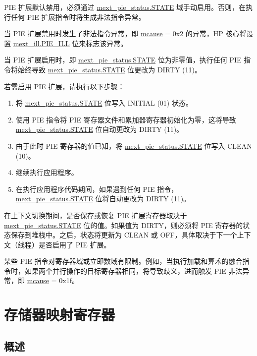 \documentclass[main\_\_CN.tex]{subfiles}
\begin{document}
PIE 扩展默认禁用，必须通过 \hyperref[fielddesc:MEXT_PIE_STATE]{mext\_pie\_status.STATE} 域手动启用。否则，在执行任何 PIE 扩展指令时将生成非法指令异常。

当 PIE 扩展禁用时发生了非法指令异常，即 \hyperref[regdesc:MCAUSE]{mcause} = 0x2 的异常，HP 核心将设置 \hyperref[fielddesc:MEXT_ILL_PIE_ILL]{mext\_ill.PIE\_ILL} 位来标志该异常。

当 PIE 扩展启用时，即 \hyperref[fielddesc:MEXT_PIE_STATE]{mext\_pie\_status.STATE} 位为非零值，执行任何 PIE 指令将始终导致 \hyperref[fielddesc:MEXT_PIE_STATE]{mext\_pie\_status.STATE} 位更改为 DIRTY (11)。

若需启用 PIE 扩展，请执行以下步骤：

\begin{enumerate}
    \item 将 \hyperref[fielddesc:MEXT_PIE_STATE]{mext\_pie\_status.STATE} 位写入 INITIAL (01) 状态。
    \item 使用 PIE 指令将 PIE 寄存器文件和累加器寄存器初始化为零，这将导致 \hyperref[fielddesc:MEXT_PIE_STATE]{mext\_pie\_status.STATE} 位自动更改为 DIRTY (11)。
    \item 由于此时 PIE 寄存器的值已知，将 \hyperref[fielddesc:MEXT_PIE_STATE]{mext\_pie\_status.STATE} 位写入 CLEAN (10)。
    \item 继续执行应用程序。
    \item 在执行应用程序代码期间，如果遇到任何 PIE 指令，\hyperref[fielddesc:MEXT_PIE_STATE]{mext\_pie\_status.STATE} 位将自动更改为 DIRTY (11)。
\end{enumerate}

在上下文切换期间，是否保存或恢复 PIE 扩展寄存器取决于 \hyperref[fielddesc:MEXT_PIE_STATE]{mext\_pie\_status.STATE} 位的值。如果值为 DIRTY，则必须将 PIE 寄存器的状态保存到堆栈中。之后，状态将更新为 CLEAN 或 OFF，具体取决于下一个上下文（线程）是否启用了 PIE 扩展。

某些 PIE 指令对寄存器域或立即数域有限制。例如，当执行加载和算术的融合指令时，如果两个并行操作的目标寄存器相同，将导致歧义，进而触发 PIE 非法异常，即 \hyperref[regdesc:MCAUSE]{mcause} = 0x1f。

\newpage
\section{存储器映射寄存器}
\label{sec:riscvcpu-tcip}

\subsection{概述}
\label{sec:riscvcpu-tcip-overview}
\end{document}
